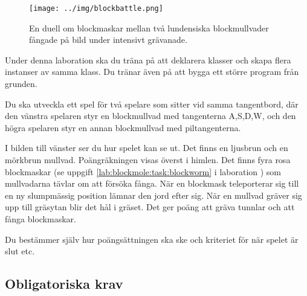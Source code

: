 {\raggedright%
\begin{minipage}{0.42\textwidth}
\begin{figure}[H]
  \texttt{[image: ../img/blockbattle.png]}
  \caption{En duell om blockmaskar mellan två lundensiska blockmullvader fångade på bild under intensivt grävanade.}
  \label{lab:blockbattle:fig:game}
\end{figure}
\end{minipage}%
}%
\newlength{\currentparskip}%
\newlength{\currentparindent}%
{
\setlength{\currentparskip}{\parskip}%
\setlength{\currentparindent}{\parindent}%
\hfill%
\begin{minipage}{0.47\textwidth}
\setlength{\parskip}{\currentparskip}%
\setlength{\parindent}{\currentparindent}%
\noindent Under denna laboration ska du träna på att deklarera klasser och skapa flera instanser av samma klass. Du tränar även på att bygga ett större program från grunden.

Du ska utveckla ett spel för två spelare som sitter vid samma tangentbord, där den vänstra spelaren styr en blockmullvad med tangenterna A,S,D,W, och den högra spelaren styr en annan blockmullvad med piltangenterna.

I bilden till vänster ser du hur spelet kan se ut. Det finns en ljusbrun och en mörkbrun mullvad. Poängräkningen visas överst i himlen. Det finns fyra rosa blockmaskar (se uppgift \ref{lab:blockmole:task:blockworm} i laboration ) som mullvadarna tävlar om att försöka fånga. När en blockmask teleporterar sig till en ny slumpmässig position lämnar den jord efter sig. När en mullvad gräver sig upp till gräsytan blir det hål i gräset.
Det ger poäng att gräva tunnlar och att fånga blockmaskar.

Du bestämmer själv hur poängsättningen ska ske och kriteriet för när spelet är slut etc.
\end{minipage}%
}



\subsection{Obligatoriska krav}

